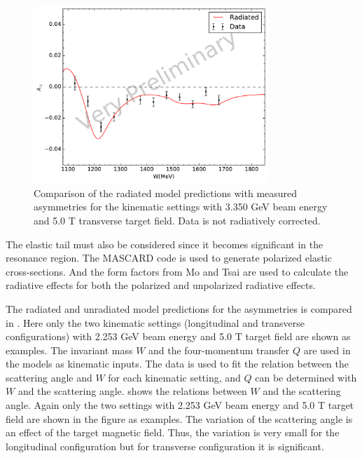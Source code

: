 \begin{figure}[tb!]
  \centering
  \includegraphics[width=0.79\textwidth]{figs/asymmetry-data-model-33505090.pdf}
  \caption[Asymmetries with $E=3.350$ GeV and $B=5.0$ T.]{Comparison of the radiated model predictions with measured asymmetries for the kinematic settings with 3.350 GeV beam energy and 5.0 T transverse target field. Data is not radiatively corrected. \label{C8S2F6}}
\end{figure}

The elastic tail must also be considered since it becomes significant in the resonance region. The MASCARD code \cite{Afanasev2001} is used to generate polarized elastic cross-sections. And the form factors from Mo and Tsai are used to calculate the radiative effects for both the polarized and unpolarized radiative effects.

The radiated and unradiated model predictions for the asymmetries is compared in . Here only the two kinematic settings (longitudinal and transverse configurations) with 2.253 GeV beam energy and 5.0 T target field are shown as examples. The invariant mass $W$ and the four-momentum transfer $Q$ are used in the models as kinematic inputs. The data is used to fit the relation between the scattering angle and $W$ for each kinematic setting, and $Q$ can be determined with $W$ and the scattering angle.  shows the relations between $W$ and the scattering angle. Again only the two settings with 2.253 GeV beam energy and 5.0 T target field are shown in the figure as examples. The variation of the scattering angle is an effect of the target magnetic field. Thus, the variation is very small for the longitudinal configuration but for transverse configuration it is significant.

